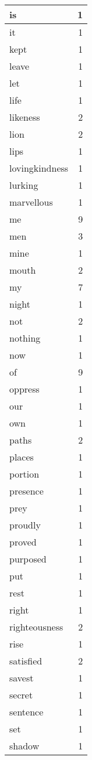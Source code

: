 \begin{center}
\begin{longtable}{l|r}
is & 1 \\ \hline
it & 1 \\ \hline
kept & 1 \\ \hline
leave & 1 \\ \hline
let & 1 \\ \hline
life & 1 \\ \hline
likeness & 2 \\ \hline
lion & 2 \\ \hline
lips & 1 \\ \hline
lovingkindness & 1 \\ \hline
lurking & 1 \\ \hline
marvellous & 1 \\ \hline
me & 9 \\ \hline
men & 3 \\ \hline
mine & 1 \\ \hline
mouth & 2 \\ \hline
my & 7 \\ \hline
night & 1 \\ \hline
not & 2 \\ \hline
nothing & 1 \\ \hline
now & 1 \\ \hline
of & 9 \\ \hline
oppress & 1 \\ \hline
our & 1 \\ \hline
own & 1 \\ \hline
paths & 2 \\ \hline
places & 1 \\ \hline
portion & 1 \\ \hline
presence & 1 \\ \hline
prey & 1 \\ \hline
proudly & 1 \\ \hline
proved & 1 \\ \hline
purposed & 1 \\ \hline
put & 1 \\ \hline
rest & 1 \\ \hline
right & 1 \\ \hline
righteousness & 2 \\ \hline
rise & 1 \\ \hline
satisfied & 2 \\ \hline
savest & 1 \\ \hline
secret & 1 \\ \hline
sentence & 1 \\ \hline
set & 1 \\ \hline
shadow & 1 \\ \hline

\end{longtable}
\end{center}
